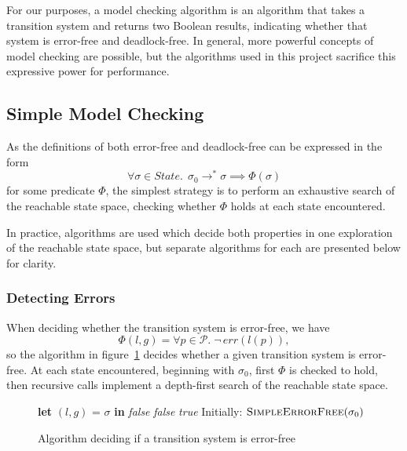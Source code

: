 \documentclass[12pt,a4paper,twoside,openright]{report}
\newcommand{\Let}[2]{\State \textbf{let} #1 = #2 \textbf{in}}
\begin{document}
For our purposes, a model checking algorithm is an
algorithm that takes a transition system and returns
two Boolean results, indicating whether that system
is error-free and deadlock-free. In general, more
powerful concepts of model checking are possible,
but the algorithms used in this project sacrifice
this expressive power for performance.

\subsection{Simple Model Checking} \label{sec:simple-model-checking}
As the definitions of both error-free and deadlock-free
can be expressed in the form
\[
	\forall \sigma \in \textit{State}.\;\, \sigma_0 \longrightarrow^* \sigma
	\implies \Phi (\sigma)
\]
for some predicate $\Phi$, the simplest strategy is to
perform an exhaustive search of the reachable state space,
checking whether $\Phi$ holds at each state encountered.

In practice, algorithms are used which decide both
properties in one exploration of the reachable state space,
but separate algorithms for each are presented
below for clarity.

\subsubsection{Detecting Errors}
When deciding whether the transition system
is error-free, we have
\[
	\Phi(l, g) = \forall p \in \mathcal{P}.\; \neg\,err(l(p)),
\]
so the algorithm in figure~\ref{fig:simple-error-free}
decides whether a given transition system
is error-free. At each
state encountered, beginning with $\sigma_0$, first $\Phi$
is checked to hold, then recursive calls implement a
depth-first search of the reachable state space.

\begin{figure}
	\begin{algorithmic}[1]
	\Let{$(l, g)$}{$\sigma$}
		\Return \textit{false}
		\EndIf
	\EndFor {}
		\Return \textit{false}
		\EndIf
	\EndFor
	\State \Return \textit{true}
	\EndProcedure
	\State
	\State Initially: $\textsc{SimpleErrorFree}(\sigma_0)$
	\end{algorithmic}
	\caption{Algorithm deciding if a transition system is error-free}
	\label{fig:simple-error-free}
\end{figure}
\end{document}
